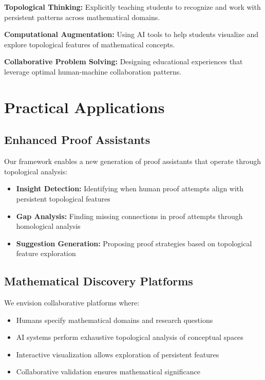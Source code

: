 \documentclass[11pt]{article}
\begin{document}
\textbf{Topological Thinking:} Explicitly teaching students to recognize and work with persistent patterns across mathematical domains.

\textbf{Computational Augmentation:} Using AI tools to help students visualize and explore topological features of mathematical concepts.

\textbf{Collaborative Problem Solving:} Designing educational experiences that leverage optimal human-machine collaboration patterns.

\section{Practical Applications}

\subsection{Enhanced Proof Assistants}

Our framework enables a new generation of proof assistants that operate through topological analysis:

\begin{itemize}
\item \textbf{Insight Detection:} Identifying when human proof attempts align with persistent topological features
\item \textbf{Gap Analysis:} Finding missing connections in proof attempts through homological analysis
\item \textbf{Suggestion Generation:} Proposing proof strategies based on topological feature exploration
\end{itemize}

\subsection{Mathematical Discovery Platforms}

We envision collaborative platforms where:

\begin{itemize}
\item Humans specify mathematical domains and research questions
\item AI systems perform exhaustive topological analysis of conceptual spaces
\item Interactive visualization allows exploration of persistent features
\item Collaborative validation ensures mathematical significance
\end{itemize}
\end{document}
